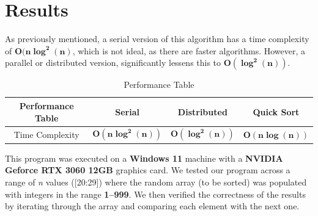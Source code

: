 \documentclass[12pt]{report}
\begin{document}
\chapter{Results}
As previously mentioned, a serial version of this algorithm has a time complexity of $\boldsymbol{O(n \log^2(n)}$, which is not ideal, as there are faster algorithms. However, a parallel or distributed version, significantly lessens this to $\boldsymbol{O(\log^2(n))}$.

\begin{table}[h!]
    \centering
    \begin{tabular}{|c|c|c|c|}
        \hline
        \rule{0pt}{3ex}\textbf{Performance Table} & \textbf{Serial}                 & \textbf{Distributed}          & \textbf{Quick Sort}          \\ \hline
        \rule{0pt}{3ex}Time Complexity            & \(\boldsymbol{O(n \log^2(n))}\) & \(\boldsymbol{O(\log^2(n))}\) & \(\boldsymbol{O(n\log(n))}\) \\ \hline
    \end{tabular}
    \caption{Performance Table}
    \label{tab:simple_table}
\end{table}

\begin{center}
\end{center}

This program was executed on a \textbf{Windows 11} machine with a \textbf{NVIDIA Geforce RTX 3060 12GB} graphics card. We tested our program across a range of \textit{n} values ([20:29]) where the random array (to be sorted) was populated with integers in the range \textbf{1–999}. We then verified the correctness of the results by iterating through the array and comparing each element with the next one.
\end{document}
